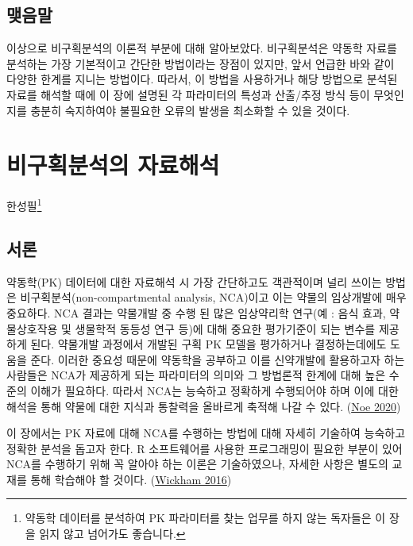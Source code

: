 \documentclass[
  11pt,
  krantz2, a4paper, twoside]{krantz}
\theoremstyle{definition}
\theoremstyle{definition}
\theoremstyle{definition}
\theoremstyle{definition}
\theoremstyle{remark}
\begin{document}
\hypertarget{uxb9fauxc74cuxb9d0-1}{%
\section{맺음말}\label{uxb9fauxc74cuxb9d0-1}}

이상으로 비구획분석의 이론적 부분에 대해 알아보았다.
비구획분석은 약동학 자료를 분석하는 가장 기본적이고 간단한 방법이라는 장점이 있지만, 앞서 언급한 바와 같이 다양한 한계를 지니는 방법이다. 
따라서, 이 방법을 사용하거나 해당 방법으로 분석된 자료를 해석할 때에 이 장에 설명된 각 파라미터의 특성과 산출/추정 방식 등이 무엇인지를 충분히 숙지하여야 불필요한 오류의 발생을 최소화할 수 있을 것이다.

\hypertarget{nca-analysis}{%
\chapter{비구획분석의 자료해석}\label{nca-analysis}}

\Large\hfill

한성필\footnote{약동학 데이터를 분석하여 PK 파라미터를 찾는 업무를 하지 않는 독자들은 이 장을 읽지 않고 넘어가도 좋습니다.}
\normalsize

\hypertarget{uxc11cuxb860-2}{%
\section{서론}\label{uxc11cuxb860-2}}

약동학(PK) 데이터에 대한 자료해석 시 가장 간단하고도 객관적이며 널리 쓰이는 방법은 비구획분석(non-compartmental analysis, NCA)이고 이는 약물의 임상개발에 매우 중요하다.
NCA 결과는 약물개발 중 수행 된 많은 임상약리학 연구(예 : 음식 효과, 약물상호작용 및 생물학적 동등성 연구 등)에 대해 중요한 평가기준이 되는 변수를 제공하게 된다.
약물개발 과정에서 개발된 구획 PK 모델을 평가하거나 결정하는데에도 도움을 준다.
이러한 중요성 때문에 약동학을 공부하고 이를 신약개발에 활용하고자 하는 사람들은 NCA가 제공하게 되는 파라미터의 의미와 그 방법론적 한계에 대해 높은 수준의 이해가 필요하다. 
따라서 NCA는 능숙하고 정확하게 수행되어야 하며 이에 대한 해석을 통해 약물에 대한 지식과 통찰력을 올바르게 축적해 나갈 수 있다. (\protect\hyperlink{ref-noe2020parameter}{Noe 2020})

이 장에서는 PK 자료에 대해 NCA를 수행하는 방법에 대해 자세히 기술하여 능숙하고 정확한 분석을 돕고자 한다. R 소프트웨어를 사용한 프로그래밍이 필요한 부분이 있어 NCA를 수행하기 위해 꼭 알아야 하는 이론은 기술하였으나, 자세한 사항은 별도의 교재를 통해 학습해야 할 것이다. (\protect\hyperlink{ref-ggplot22016}{Wickham 2016})
\end{document}
